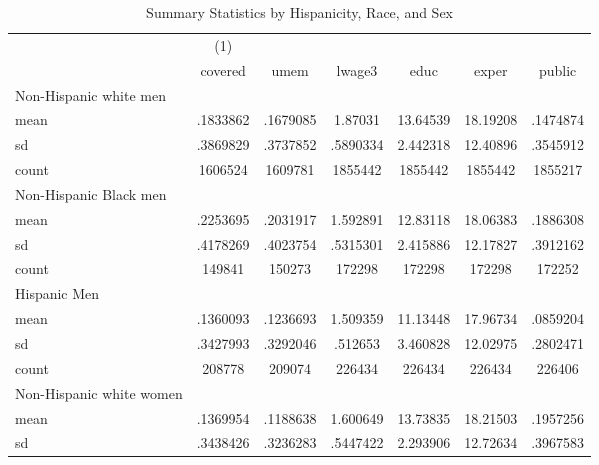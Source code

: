 {
\def\sym#1{\ifmmode^{#1}\else\(^{#1}\)\fi}
\begin{longtable}{l*{1}{cccccc}}
\caption{Summary Statistics by Hispanicity, Race, and Sex}\\
\hline\hline\endfirsthead\hline\endhead\hline\endfoot\endlastfoot
            &\multicolumn{1}{c}{(1)}&            &            &            &            &            \\
            &     covered&        umem&      lwage3&        educ&       exper&      public\\
\hline
Non-Hispanic white men&            &            &            &            &            &            \\
mean        &    .1833862&    .1679085&     1.87031&    13.64539&    18.19208&    .1474874\\
sd          &    .3869829&    .3737852&    .5890334&    2.442318&    12.40896&    .3545912\\
count       &     1606524&     1609781&     1855442&     1855442&     1855442&     1855217\\
\hline
Non-Hispanic Black men&            &            &            &            &            &            \\
mean        &    .2253695&    .2031917&    1.592891&    12.83118&    18.06383&    .1886308\\
sd          &    .4178269&    .4023754&    .5315301&    2.415886&    12.17827&    .3912162\\
count       &      149841&      150273&      172298&      172298&      172298&      172252\\
\hline
Hispanic Men&            &            &            &            &            &            \\
mean        &    .1360093&    .1236693&    1.509359&    11.13448&    17.96734&    .0859204\\
sd          &    .3427993&    .3292046&     .512653&    3.460828&    12.02975&    .2802471\\
count       &      208778&      209074&      226434&      226434&      226434&      226406\\
\hline
Non-Hispanic white women&            &            &            &            &            &            \\
mean        &    .1369954&    .1188638&    1.600649&    13.73835&    18.21503&    .1957256\\
sd          &    .3438426&    .3236283&    .5447422&    2.293906&    12.72634&    .3967583\\

\end{longtable}}
